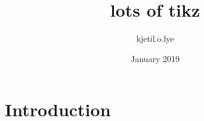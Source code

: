 \documentclass{article}
\title{lots of tikz}
\author{kjetil.o.lye }
\date{January 2019}
\begin{document}
\maketitle

\section{Introduction}

\end{document}
